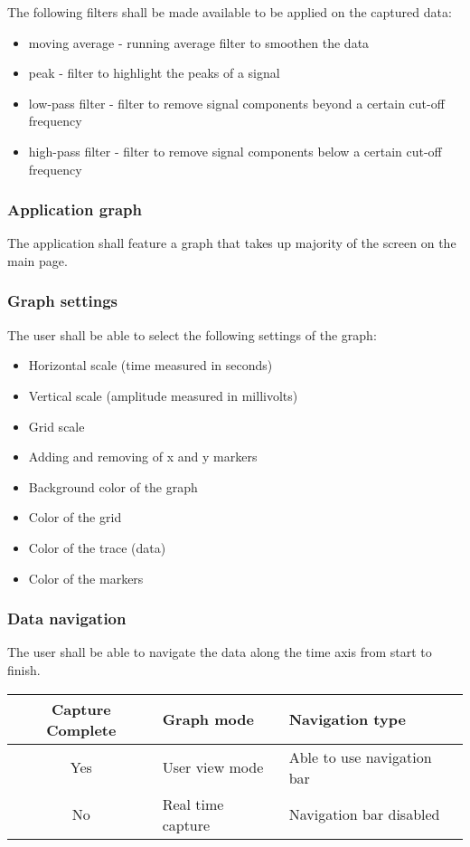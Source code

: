 \documentclass[12pt,a4paper]{article}
\begin{document}
The following filters shall be made available to be applied on the captured data:

\begin{itemize}
\item moving average - running average filter to smoothen the data 
\item peak - filter to highlight the peaks of a signal
\item low-pass filter - filter to remove signal components beyond a certain cut-off frequency
\item high-pass filter - filter to remove signal components below a certain cut-off frequency
\end{itemize}

\subsubsection{Application graph}

The application shall feature a graph that takes up majority of the screen on the main page.

\subsubsection{Graph settings}

The user shall be able to select the following settings of the graph:

\begin{itemize}
\item Horizontal scale (time measured in seconds)
\item Vertical scale (amplitude measured in millivolts)
\item Grid scale 
\item Adding and removing of x and y markers
\item Background color of the graph
\item Color of the grid
\item Color of the trace (data)
\item Color of the markers
\end{itemize}


\subsubsection{Data navigation}

The user shall be able to navigate the data along the time axis from start to finish.

\begin{table}[htbp]
	\centering
	\begin{tabular}{|c|l|l|}
		\hline
		\textbf{Capture Complete} & \textbf{Graph mode}  & \textbf{Navigation type} \\
		\hline
		Yes & User view mode & Able to use navigation bar\\
		\hline
		No & Real time capture & Navigation bar disabled \\
		\hline
	\end{tabular}
\end{table}
\end{document}
